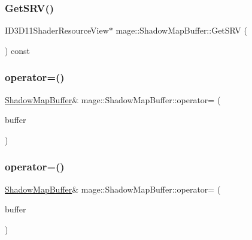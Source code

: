 \hypertarget{structmage_1_1_shadow_map_buffer_a3c923d6cea528af3420085fafd8f9f8e}{}\label{structmage_1_1_shadow_map_buffer_a3c923d6cea528af3420085fafd8f9f8e} 
\subsubsection{\texorpdfstring{Get\+S\+R\+V()}{GetSRV()}}
{\footnotesize\ttfamily I\+D3\+D11\+Shader\+Resource\+View$\ast$ mage\+::\+Shadow\+Map\+Buffer\+::\+Get\+S\+RV (\begin{DoxyParamCaption}{ }\end{DoxyParamCaption}) const\hspace{0.3cm}{\ttfamily [noexcept]}}

\hypertarget{structmage_1_1_shadow_map_buffer_ace8a042252b8285a7f6ceb838053f7f6}{}\label{structmage_1_1_shadow_map_buffer_ace8a042252b8285a7f6ceb838053f7f6} 
\subsubsection{\texorpdfstring{operator=()}{operator=()}\hspace{0.1cm}{\footnotesize\ttfamily [1/2]}}
{\footnotesize\ttfamily \hyperlink{structmage_1_1_shadow_map_buffer}{Shadow\+Map\+Buffer}\& mage\+::\+Shadow\+Map\+Buffer\+::operator= (\begin{DoxyParamCaption}\item[{const \hyperlink{structmage_1_1_shadow_map_buffer}{Shadow\+Map\+Buffer} \&}]{buffer }\end{DoxyParamCaption})\hspace{0.3cm}{\ttfamily [delete]}}

\hypertarget{structmage_1_1_shadow_map_buffer_a7ecdf05195a56dbbfbe473df2aad6ba6}{}\label{structmage_1_1_shadow_map_buffer_a7ecdf05195a56dbbfbe473df2aad6ba6} 
\subsubsection{\texorpdfstring{operator=()}{operator=()}\hspace{0.1cm}{\footnotesize\ttfamily [2/2]}}
{\footnotesize\ttfamily \hyperlink{structmage_1_1_shadow_map_buffer}{Shadow\+Map\+Buffer}\& mage\+::\+Shadow\+Map\+Buffer\+::operator= (\begin{DoxyParamCaption}\item[{\hyperlink{structmage_1_1_shadow_map_buffer}{Shadow\+Map\+Buffer} \&\&}]{buffer }\end{DoxyParamCaption})\hspace{0.3cm}{\ttfamily [delete]}}

